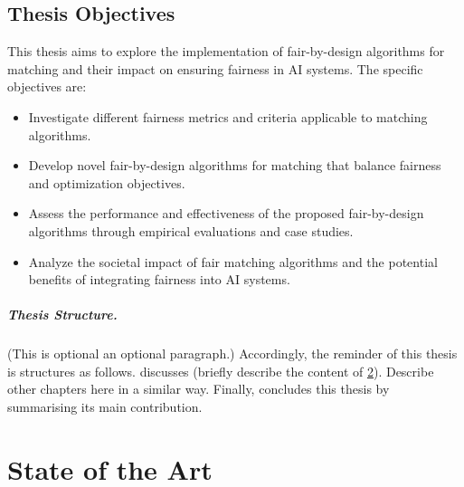 \documentclass[12pt,a4paper,openright,twoside]{book}
\begin{document}
\section{Thesis Objectives}
This thesis aims to explore the implementation of fair-by-design algorithms for matching and their impact on ensuring fairness in AI systems. The specific objectives are:

\begin{itemize}
    \item Investigate different fairness metrics and criteria applicable to matching algorithms.
    \item Develop novel fair-by-design algorithms for matching that balance fairness and optimization objectives.
    \item Assess the performance and effectiveness of the proposed fair-by-design algorithms through empirical evaluations and case studies.
    \item Analyze the societal impact of fair matching algorithms and the potential benefits of integrating fairness into AI systems.
\end{itemize}


%
\paragraph{Thesis Structure.} %
%

(This is optional an optional paragraph.)
%
Accordingly, the reminder of this thesis is structures as follows.
%
 discusses (briefly describe the content of \cref{chap:background}).
%
Describe other chapters here in a similar way.
%
Finally,  concludes this thesis by summarising its main contribution.

\chapter{State of the Art} %
\label{chap:background}


%
\end{document}
